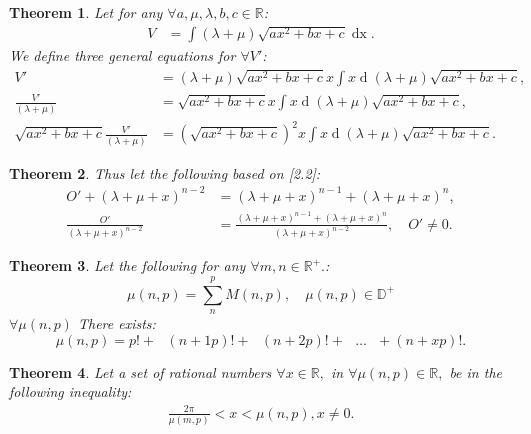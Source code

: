 \documentclass[10pt]{article}
\theoremstyle{plain}
\newtheorem{theorem}{Theorem}[section]
\theoremstyle{definition}
\theoremstyle{remark}
\begin{document}
\begin{theorem}
	Let for any $\forall a, \mu, \lambda, b, c \in \mathbb{R}$:
	\begin{align*}
		V &= \int (\lambda + \mu)\sqrt{ax^2 + bx  +c} \operatorname{dx}.
	\end{align*}
	We define three general equations for $\forall V'$:
	\begin{align*}
		V' &= (\lambda + \mu)\sqrt{ax^2 + bx  +c}x \int x \operatorname{d}(\lambda + \mu)\sqrt{ax^2 + bx  +c},\\
		\frac{V'}{(\lambda + \mu)} &= \sqrt{ax^2 + bx  +c}x \int x \operatorname{d}(\lambda + \mu)\sqrt{ax^2 + bx  +c},\\
		\sqrt{ax^2 + bx  +c}\frac{V'}{(\lambda + \mu)} &= (\sqrt{ax^2 + bx  +c})^{2}x \int x \operatorname{d}(\lambda + \mu)\sqrt{ax^2 + bx  +c}.
	\end{align*}
\end{theorem}

\begin{theorem}
	Thus let the following based on [2.2]:
	\begin{align*}
		O' + (\lambda + \mu + x)^{n-2} &= (\lambda + \mu + x)^{n-1} + (\lambda + \mu + x)^{n},\\
		\frac{O'}{(\lambda + \mu + x)^{n-2}} &= \frac{(\lambda + \mu + x)^{n-1} + (\lambda + \mu + x)^{n}}{(\lambda + \mu + x)^{n-2}}, \quad O' \neq 0.
	\end{align*}
\end{theorem}

\begin{theorem}
	Let the following for any $\forall m, n \in \mathbb{R}^{+}.$:
\begin{equation}
    \mu(n, p) = \sum_{n}^{p} M(n, p), \quad \mu(n, p) \in \mathbb{D}^{+}
\end{equation}
$\forall \mu(n, p)$ There exists:
\begin{equation}
    \mu(n, p) = p! + \text{ } (n+1p)! + \text{ } (n+2p)! + \text{ } \dots \text{ } + (n+xp)!.
\end{equation}
\end{theorem}

\begin{theorem}
	Let a set of rational numbers $\forall x \in \mathbb{R},$ in $\forall \mu(n, p) \in \mathbb{R},$ be in the following inequality:
	\begin{align*}
		\frac{2\pi}{\mu(m, p)} < x < \mu(n, p), x \neq 0.
	\end{align*}
\end{theorem}
\end{document}
